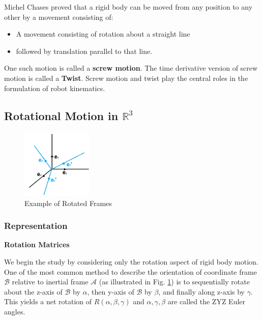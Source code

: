 \documentclass[letterpaper]{article}
\begin{document}
Michel Chases proved that a rigid body can be moved from any position to any other by a movement consisting of:\vspace{-0.5em}
\begin{itemize}
    \item A movement consisting of rotation about a straight line\vspace{-1em}
    \item followed by translation parallel to that line. \vspace{-0.5em}
\end{itemize}
One such motion is called a \textbf{screw motion}. The time derivative version of screw motion is called a
\textbf{Twist}. Screw motion and twist play the central roles in the formulation of robot kinematics. 

\subsection{Rotational Motion in $\mathbb{R}^3$}

\begin{figure}
    \centering
    \includegraphics[width=0.3\textwidth]{figs/Rotation_of_a_coordinate_system.png}
    \caption{Example of Rotated Frames} \label{fig:rot_fme}
\end{figure}

\subsubsection{Representation} \label{sec:rotmat}
\textbf{Rotation Matrices}

We begin the study by considering only the rotation aspect of rigid body motion. 
One of the most common method to describe the orientation of coordinate frame $\mathcal{B}$ relative to
inertial frame $\mathcal{A}$ (as illustrated in Fig. \ref{fig:rot_fme}) is to sequentially rotate about the z-axis of $\mathcal{B}$ by $\alpha$, 
then y-axis of $\mathcal{B}$ by $\beta$, and finally along z-axis by $\gamma$. This yields a net rotation
of $R(\alpha, \beta, \gamma)$ and $\alpha, \gamma, \beta$ are called the ZYZ Euler angles. 
\end{document}
